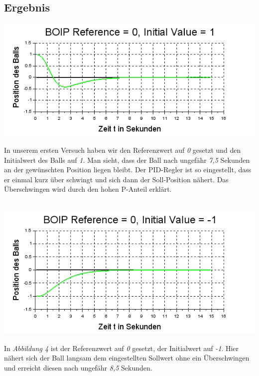 \subsection{Ergebnis}

\begin{center}
	\begin{minipage}{\linewidth}
	\centering
	\includegraphics[scale=0.7]{images/ref0_init1.png}
	\end{minipage}
\end{center}
In unserem ersten Versuch haben wir den Referenzwert auf \textit{0} gesetzt und den Initialwert des Balls auf \textit{1}. Man sieht, dass der Ball nach ungefähr \textit{7,5} Sekunden an der gewünschten Position liegen bleibt. Der PID-Regler ist so eingestellt, dass er einmal kurz über schwingt und sich dann der Soll-Position nähert. Das Überschwingen wird durch den hohen P-Anteil erklärt.\\ \\

\begin{center}
	\begin{minipage}{\linewidth}
	\centering
	\includegraphics[scale=0.7]{images/ref0_init-1.png}
	\end{minipage}
\end{center}
In \textit{Abbildung 4} ist der Referenzwert auf \textit{0} gesetzt, der Initialwert auf \textit{-1}. Hier nähert sich der Ball langsam dem eingestellten Sollwert ohne ein Überschwingen und erreicht diesen nach ungefähr \textit{8,5} Sekunden. \\ \\

